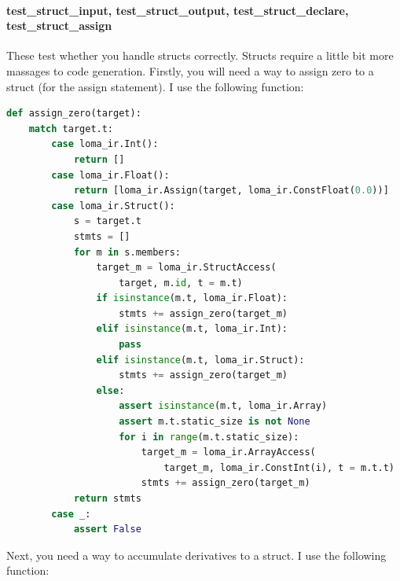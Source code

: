 \paragraph{test_struct_input, test_struct_output, test_struct_declare, test_struct_assign} These test whether you handle structs correctly. Structs require a little bit more massages to code generation. Firstly, you will need a way to assign zero to a struct (for the assign statement). I use the following function:
\begin{lstlisting}[language=Python]
def assign_zero(target):
    match target.t:
        case loma_ir.Int():
            return []
        case loma_ir.Float():
            return [loma_ir.Assign(target, loma_ir.ConstFloat(0.0))]
        case loma_ir.Struct():
            s = target.t
            stmts = []
            for m in s.members:
                target_m = loma_ir.StructAccess(
                    target, m.id, t = m.t)
                if isinstance(m.t, loma_ir.Float):
                    stmts += assign_zero(target_m)
                elif isinstance(m.t, loma_ir.Int):
                    pass
                elif isinstance(m.t, loma_ir.Struct):
                    stmts += assign_zero(target_m)
                else:
                    assert isinstance(m.t, loma_ir.Array)
                    assert m.t.static_size is not None
                    for i in range(m.t.static_size):
                        target_m = loma_ir.ArrayAccess(
                            target_m, loma_ir.ConstInt(i), t = m.t.t)
                        stmts += assign_zero(target_m)
            return stmts
        case _:
            assert False
\end{lstlisting}
Next, you need a way to accumulate derivatives to a struct. I use the following function:
